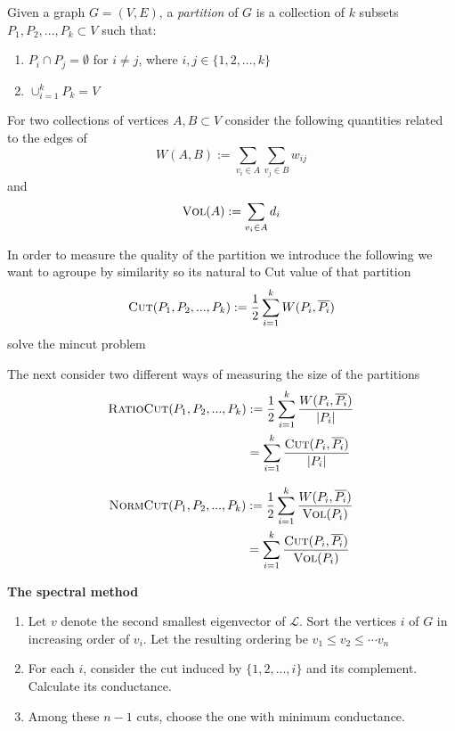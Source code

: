 \begin{definition}
	Given a graph $G = (V, E)$, a \textit{partition } of $G$ is a collection of $k$ subsets $P_1, P_2, ..., P_k\subset V$ such that:
	\begin{enumerate}
		\item $P_i \cap P_j = \emptyset$ for $i\neq j$, where $i,j\in \{1,2,...,k\}$
		\item $\cup_{i=1}^k P_k = V$
	\end{enumerate}	 
\end{definition}

	For two collections of vertices $A, B\subset V$ consider the following quantities related to the edges of 
	\begin{displaymath}
		W(A,B) := \sum_{v_i\in A}\sum_{v_j \in B}w_{ij}
	\end{displaymath}
	and
	\begin{displaymath}
		\textsc{Vol}(A) :=  \sum_{v_i \in A} d_i 
	\end{displaymath}

In order to measure the quality of the partition we introduce the following 
we want to agroupe by similarity so its natural to 
Cut value of that partition
\begin{displaymath}
	\textsc{Cut}(P_1, P_2, ..., P_k) := \frac{1}{2} \sum_{i=1}^k W(P_i, \overline{P_i})
\end{displaymath}
solve the mincut problem

The next consider two different ways of measuring the size of the partitions
\begin{align*}
	\textsc{RatioCut}(P_1, P_2, ..., P_k) &:= \frac{1}{2} \sum_{i=1}^k \frac{W(P_i, \overline{P_i})}{\left| P_i \right|} \\
	&= \sum_{i=1}^k \frac{\textsc{Cut}(P_i, \overline{P_i})}{\left| P_i \right|}
\end{align*}

\begin{align*}
	\textsc{NormCut}(P_1, P_2, ..., P_k) & := \frac{1}{2} \sum_{i=1}^k \frac{W(P_i, \overline{P_i})}{\textsc{Vol}(P_i)}\\
	&= \sum_{i=1}^k \frac{\textsc{Cut}(P_i, \overline{P_i})}{\textsc{Vol}(P_i)}
\end{align*}

\textbf{The spectral method}
\begin{enumerate}
	\item Let $v$ denote the second smallest eigenvector of $\mathcal{L}$. Sort the vertices $i$ of $G$ in increasing order of $v_i$. Let the resulting ordering be $v_1 \leq v_2 \leq \cdots v_n$
	\item For each $i$, consider the cut induced by $\{1,2,..., i\}$ and its complement. Calculate its conductance.
	\item Among these $n-1$ cuts, choose the one with minimum conductance.
\end{enumerate}

